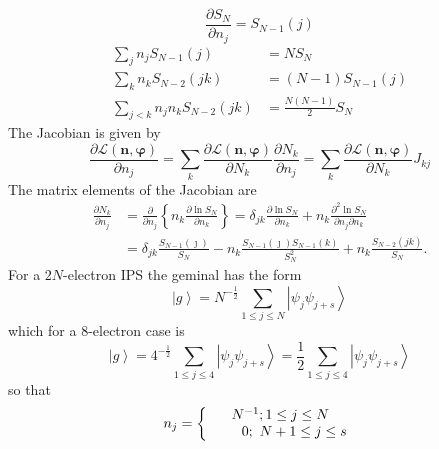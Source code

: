 \documentclass[aps,preprint]{revtex4}%
\begin{document}
\begin{equation}
\frac{\partial S_{N}}{\partial n_{j}}=S_{N-1}\left(  j\right)
\end{equation}%
\begin{align}
\sum_{j}n_{j}S_{N-1}\left(  j\right)   &  =NS_{N}\\
\sum_{k}n_{k}S_{N-2}\left(  jk\right)   &  =\left(  N-1\right)  S_{N-1}\left(
j\right) \\
\sum_{j<k}n_{j}n_{k}S_{N-2}\left(  jk\right)   &  =\frac{N\left(  N-1\right)
}{2}S_{N}%
\end{align}
The Jacobian is given by
\begin{equation}
\frac{\partial\mathcal{L}\left(  \mathbf{n,\varphi}\right)  }{\partial n_{j}%
}=\sum_{k}\frac{\partial\mathcal{L}\left(  \mathbf{n,\varphi}\right)
}{\partial N_{k}}\frac{\partial N_{k}}{\partial n_{j}}=\sum_{k}\frac
{\partial\mathcal{L}\left(  \mathbf{n,\varphi}\right)  }{\partial N_{k}}J_{kj}%
\end{equation}
The matrix elements of the Jacobian are
\begin{align}
\frac{\partial N_{k}}{\partial n_{j}}  &  =\frac{\partial}{\partial n_{j}%
}\left\{  n_{k}\frac{\partial\ln S_{N}}{\partial n_{k}}\right\}  =\delta
_{jk}\frac{\partial\ln S_{N}}{\partial n_{k}}+n_{k}\frac{\partial^{2}\ln
S_{N}}{\partial n_{j}\partial n_{k}}\\
&  =\delta_{jk}\frac{S_{N-1}\left(  \jmath\right)  }{S_{N}}-n_{k}\frac
{S_{N-1}\left(  \jmath\right)  S_{N-1}\left(  k\right)  }{S_{N}^{2}}%
+n_{k}\frac{S_{N-2}\left(  jk\right)  }{S_{N}}.\nonumber
\end{align}
For a $2N$-electron IPS the geminal has the form
\begin{equation}
\left\vert g\right\rangle =N^{-\frac{1}{2}}\sum_{1\leq j\leq N}\left\vert
\psi_{j}\psi_{j+s}\right\rangle
\end{equation}
which for a $8$-electron case is
\begin{equation}
\left\vert g\right\rangle =4^{-\frac{1}{2}}\sum_{1\leq j\leq4}\left\vert
\psi_{j}\psi_{j+s}\right\rangle =\frac{1}{2}\sum_{1\leq j\leq4}\left\vert
\psi_{j}\psi_{j+s}\right\rangle
\end{equation}
so that
\begin{equation}
n_{j}=\left\{
\begin{array}
[c]{c}%
N^{-1};1\leq j\leq N\\
\qquad0;\text{ }N+1\leq j\leq s
\end{array}
\right.
\end{equation}
\end{document}
